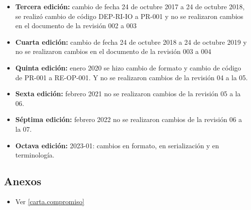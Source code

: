 \begin{itemize}
	\item \textbf{Tercera edición:} cambio de fecha 24 de octubre 2017 a 24 de octubre 2018, se realizó cambio de código DEP-RI-IO a PR-001 y no se realizaron cambios en el documento de la revisión 002 a 003
	\item \textbf{Cuarta edición:} cambio de fecha 24 de octubre 2018 a 24 de octubre 2019 y no se realizaron cambios en el documento de la revisión 003 a 004
	\item \textbf{Quinta edición:} enero 2020 se hizo cambio de formato y cambio de código de PR-001 a RE-OP-001. Y no se realizaron cambios de la revisión 04 a la 05.
	\item \textbf{Sexta edición:} febrero 2021 no se realizaron cambios de la revisión 05 a la 06.
	\item \textbf{Séptima edición:} febrero 2022 no se realizaron cambios de la revisión 06 a la 07.
	\item \textbf{Octava edición:} 2023-01: cambios en formato, en serialización y en terminología.
\end{itemize}

\subsection{Anexos}
\begin{itemize}
	\item Ver \cref{carta.compromiso}
\end{itemize}